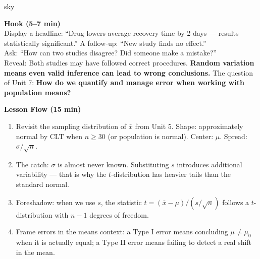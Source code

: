\documentclass[10pt]{article}
\begin{document}
\begin{skillbox}{sky}
\begin{minipage}[t]{0.48\linewidth}
    \textbf{Hook (5--7 min)}\\
    Display a headline: ``Drug lowers average recovery time by 2 days --- results
    statistically significant.'' A follow-up: ``New study finds no effect.''\\[4pt]
    Ask: ``How can two studies disagree? Did someone make a mistake?''\\[4pt]
    Reveal: Both studies may have followed correct procedures.
    \textbf{Random variation means even valid inference can lead to wrong conclusions.}
    The question of Unit 7: \textbf{How do we quantify and manage error when working
    with population means?}
\end{minipage}
\hfill
\begin{minipage}[t]{0.48\linewidth}
    \textbf{Lesson Flow (15 min)}
    \begin{enumerate}
        \item Revisit the sampling distribution of $\bar x$ from Unit 5. Shape:
              approximately normal by CLT when $n \ge 30$ (or population is normal).
              Center: $\mu$. Spread: $\sigma/\sqrt{n}$.
        \item The catch: $\sigma$ is almost never known. Substituting $s$ introduces
              additional variability --- that is why the $t$-distribution has heavier
              tails than the standard normal.
        \item Foreshadow: when we use $s$, the statistic
              $t = (\bar x - \mu)/(s/\sqrt{n})$ follows a $t$-distribution with
              $n - 1$ degrees of freedom.
        \item Frame errors in the means context: a Type I error means concluding
              $\mu \ne \mu_0$ when it is actually equal; a Type II error means failing
              to detect a real shift in the mean.
    \end{enumerate}
\end{minipage}
\end{skillbox}
\end{document}
